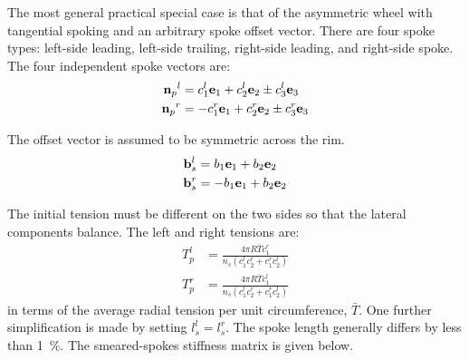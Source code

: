 \documentclass[../../thesis.tex]{subfiles}
\begin{document}
The most general practical special case is that of the asymmetric wheel with tangential spoking and an arbitrary spoke offset vector. There are four spoke types: left-side leading, left-side trailing, right-side leading, and right-side spoke. The four independent spoke vectors are:
\begin{subequations}
\begin{align}
{\mathbf{n}_p}^l &= c_1^l \mathbf{e}_1 + c_2^l \mathbf{e}_2 \pm c_3^l \mathbf{e}_3\\
{\mathbf{n}_p}^r &= -c_1^r \mathbf{e}_1 + c_2^r \mathbf{e}_2 \pm c_3^r \mathbf{e}_3
\end{align}
\end{subequations}

The offset vector is assumed to be symmetric across the rim.
\begin{subequations}
\begin{align}
\mathbf{b}_s^l &= b_1 \mathbf{e}_1 + b_2 \mathbf{e}_2\\
\mathbf{b}_s^r &= -b_1 \mathbf{e}_1 + b_2 \mathbf{e}_2
\end{align}
\end{subequations}

The initial tension must be different on the two sides so that the lateral components balance. The left and right tensions are:
\begin{subequations}
\begin{align}
T_p^l &= \frac{4\pi R \bar{T} c_1^r}{n_s(c_1^lc_2^r + c_1^rc_2^l)}\\
T_p^r &= \frac{4\pi R \bar{T} c_1^l}{n_s(c_1^lc_2^r + c_1^rc_2^l)}
\end{align}
\end{subequations}
in terms of the average radial tension per unit circumference, $\bar{T}$. One further simplification is made by setting $l_s^l=l_s^r$. The spoke length generally differs by less than \SI{1}{\percent}. The smeared-spokes stiffness matrix is given below.
\end{document}
